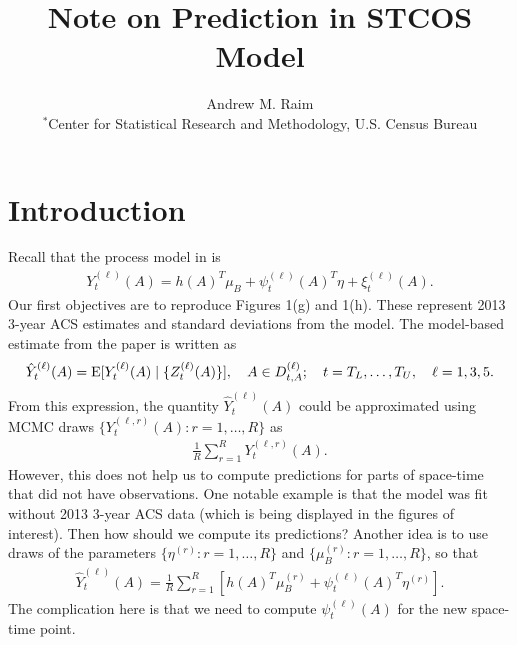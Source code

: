 \documentclass[10pt]{article}
\title{Note on Prediction in STCOS Model}
\author{Andrew M. Raim
\vspace{0.5em} \\
$^*$Center for Statistical Research and Methodology, U.S. Census Bureau
}
\begin{document}
\maketitle

\section{Introduction}
\label{sec:intro}
Recall that the process model in \citet{BradleyEtAl2016-STAT} is
%
\begin{align*}
Y_t^{(\ell)}(A) = h(A)^T \mu_B + \psi_t^{(\ell)}(A)^T \eta + \xi_t^{(\ell)}(A).
\end{align*}
%
Our first objectives are to reproduce Figures 1(g) and 1(h). These represent 2013 3-year ACS estimates and standard deviations from the model. The model-based estimate from the paper is written as
%
\begin{align*}
\hat{Y}_t^{(\ell)}(A) = \operatorname{E}[ Y_t^{(\ell)}(A) \mid \{ Z_t^{(\ell)}(A) \} ],
\quad A \in D_{t,A}^{(\ell)};
\quad t = T_L, \ldots, T_U, 
\quad \ell = 1,3,5.
\end{align*}
%
From this expression, the quantity $\hat{Y}_t^{(\ell)}(A)$ could be approximated using MCMC draws $\{ Y_t^{(\ell, r)}(A) : r = 1, \ldots, R \}$ as
%
\begin{align*}
\frac{1}{R} \sum_{r=1}^R Y_t^{(\ell, r)}(A).
\end{align*}
%
However, this does not help us to compute predictions for parts of space-time that did not have observations. One notable example is that the model was fit without 2013 3-year ACS data (which is being displayed in the figures of interest). Then how should we compute its predictions? Another idea is to use draws of the parameters $\{ \eta^{(r)} : r = 1, \ldots, R \}$ and $\{ \mu_B^{(r)} : r = 1, \ldots, R \}$, so that
%
\begin{align*}
\hat{Y}_t^{(\ell)}(A) = \frac{1}{R} \sum_{r=1}^R \left[ h(A)^T \mu_B^{(r)} + \psi_t^{(\ell)}(A)^T \eta^{(r)} \right].
\end{align*}
%
The complication here is that we need to compute $\psi_t^{(\ell)}(A)$ for the new space-time point.





%
\end{document}
